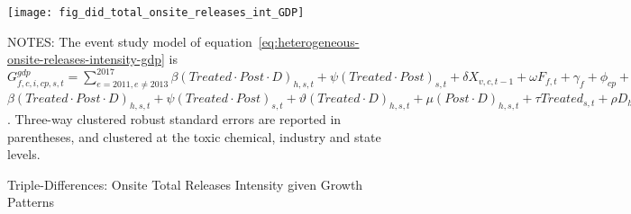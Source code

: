 \begin{figure}[H]
    \centering
    \texttt{[image: fig\_did\_total\_onsite\_releases\_int\_GDP]}
    \caption{Triple-Differences: Onsite Total Releases Intensity given Growth Patterns}
    \label{fig:heterogeneous-onsite-releases-intensity-gdp}
    \begin{minipage}{12cm}
        \vspace{0.05in}
        NOTES: The event study model of equation~\ref{eq:heterogeneous-onsite-releases-intensity-gdp} is $G_{f,c,i,cp,s,t}^{gdp} = \sum_{{e = 2011},{e \neq 2013}}^{2017} \beta (Treated \cdot Post \cdot D)_{h,s,t} + \psi (Treated \cdot Post)_{s,t} + \delta X_{v,c,t-1} + \omega F_{f,t} + \gamma_{f} + \phi_{cp} + \eta_{c,t} + \left[\lambda_{t} + \theta_{f,h} + \sigma_{s} + \zeta_{c} \right] + \varepsilon_{f,c,i,cp,s,t}$$\beta (Treated \cdot Post \cdot D)_{h,s,t} + \psi (Treated \cdot Post)_{s,t} + \vartheta (Treated \cdot D)_{h,s,t} + \mu (Post \cdot D)_{h,s,t} + \tau Treated_{s,t} + \rho D_{h,s,t} + \alpha Post_{t} + \delta X_{v,c,t-1} + \omega F_{f,t} + \gamma_{f} + \phi_{cp} + \eta_{c,t} + \left[\lambda_{t} + \theta_{h} + \sigma_{s} + \zeta_{c} \right] + \varepsilon_{f,c,i,cp,s,t}$. Three-way clustered robust standard errors are reported in parentheses, and clustered at the toxic chemical, industry and state levels.
    \end{minipage}
\end{figure}